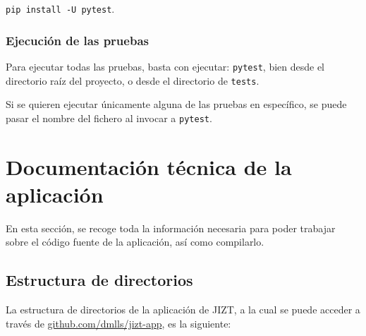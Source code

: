 \texttt{pip install -U pytest}.

\subsubsection{Ejecución de las pruebas}

Para ejecutar todas las pruebas, basta con ejecutar: \texttt{pytest}, bien desde el directorio raíz del proyecto, o desde el directorio de \texttt{tests}.

Si se quieren ejecutar únicamente alguna de las pruebas en específico, se puede pasar el nombre del fichero al invocar a \texttt{pytest}.

\section{Documentación técnica de la aplicación}

En esta sección, se recoge toda la información necesaria para poder trabajar sobre el código fuente de la aplicación, así como compilarlo.


\subsection{Estructura de directorios}

La estructura de directorios de la aplicación de JIZT, a la cual se puede acceder a través de \href{https://github.com/dmlls/jizt-app}{github.com/dmlls/jizt-app}, es la siguiente:

